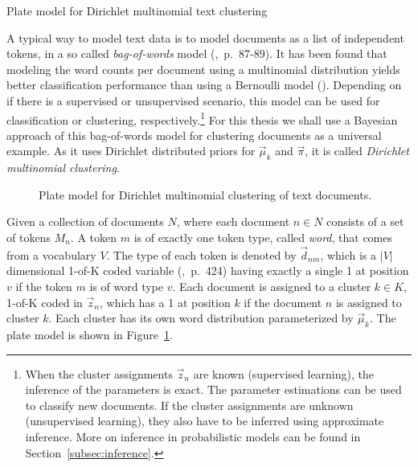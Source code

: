 \begin{Example} Plate model for Dirichlet multinomial text clustering
\label{ex:clustering-pm}

A typical way to model text data is to model documents as a list of independent tokens, in a so called \emph{bag-of-words} model (\cite{murphy2012machine},~p.~87-89). It has been found that modeling the word counts per document using a multinomial distribution yields better classification performance than using a Bernoulli model (\cite{mccallum1998comparison}). Depending on if there is a supervised or unsupervised scenario, this model can be used for classification or clustering, respectively.\footnote{When the cluster assignments $\vec z_n$ are known (supervised learning), the inference of the parameters is exact. The parameter estimations can be used to classify new documents. If the cluster assignments are unknown (unsupervised learning), they also have to be inferred using approximate inference. More on inference in probabilistic models can be found in Section~\ref{subsec:inference}.} For this thesis we shall use a Bayesian approach of this bag-of-words model for clustering documents as a universal example. As it uses Dirichlet distributed priors for $\vec \mu_k$ and $\vec \pi$, it is called \emph{Dirichlet multinomial clustering}.

\begin{figure}[t]
	\begin{center}
    	\scalebox{\tikzScale}{\adjustTikzSize }
	\end{center}
\caption[Plate model for Dirichlet multinomial clustering of text documents]{Plate model for Dirichlet multinomial clustering of text documents.}
		\label{fig:clustering_platemodel}
\end{figure}

Given a collection of documents $N$, where each document $n \in N$ consists of a set of tokens $M_n$. A token $m$ is of exactly one token type, called \emph{word}, that comes from a vocabulary $V$. The type of each token is denoted by $\vec d_{nm}$, which is a $|V|$ dimensional 1-of-K coded variable (\cite{bishop2006pattern},~p.~424) having exactly a single 1 at position $v$ if the token $m$ is of word type $v$. Each document is assigned to a cluster $k \in K$, 1-of-K coded in $\vec z_{n}$, which has a 1 at position $k$ if the document $n$ is assigned to cluster $k$. Each cluster has its own word distribution parameterized by $\vec \mu_k$. The plate model is shown in Figure~\ref{fig:clustering_platemodel}.


\end{Example}
